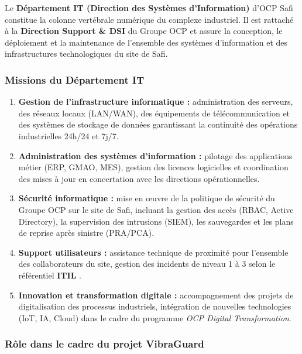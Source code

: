 \documentclass[12pt, a4paper, oneside]{report}
\begin{document}
Le \textbf{Département IT (Direction des Systèmes d'Information)} d'OCP Safi constitue
la colonne vertébrale numérique du complexe industriel. Il est rattaché à la
\textbf{Direction Support \& DSI} du Groupe OCP et assure la conception, le déploiement
et la maintenance de l'ensemble des systèmes d'information et des infrastructures
technologiques du site de Safi.

\subsubsection*{Missions du Département IT}

\begin{enumerate}
  \item \textbf{Gestion de l'infrastructure informatique :} administration des serveurs,
  des réseaux locaux (LAN/WAN), des équipements de télécommunication et des systèmes de
  stockage de données garantissant la continuité des opérations industrielles 24h/24 et
  7j/7.

  \item \textbf{Administration des systèmes d'information :} pilotage des applications
  métier (ERP, GMAO, MES), gestion des licences logicielles et coordination des mises à
  jour en concertation avec les directions opérationnelles.

  \item \textbf{Sécurité informatique :} mise en œuvre de la politique de sécurité du
  Groupe OCP sur le site de Safi, incluant la gestion des accès (RBAC, Active Directory),
  la supervision des intrusions (SIEM), les sauvegardes et les plans de reprise après
  sinistre (PRA/PCA).

  \item \textbf{Support utilisateurs :} assistance technique de proximité pour l'ensemble
  des collaborateurs du site, gestion des incidents de niveau 1 à 3 selon le référentiel
  \textbf{ITIL} \cite{itil2019}.

  \item \textbf{Innovation et transformation digitale :} accompagnement des projets de
  digitalisation des processus industriels, intégration de nouvelles technologies (IoT,
  IA, Cloud) dans le cadre du programme \textit{OCP Digital Transformation}.
\end{enumerate}

\subsubsection*{Rôle dans le cadre du projet VibraGuard}
\end{document}
